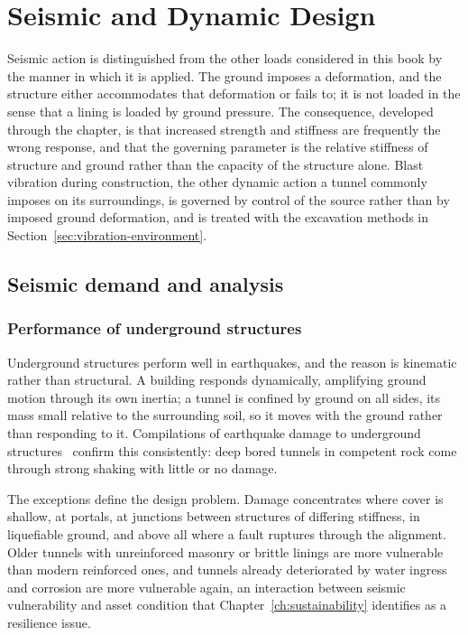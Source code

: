 \chapter{Seismic and Dynamic Design}
\label{ch:seismic}

Seismic action is distinguished from the other loads considered in this book
by the manner in which it is applied. The ground imposes a deformation, and
the structure either accommodates that deformation or fails to; it is not
loaded in the sense that a lining is loaded by ground pressure. The
consequence, developed through the chapter, is that increased strength and
stiffness are frequently the wrong response, and that the governing parameter
is the relative stiffness of structure and ground rather than the capacity of
the structure alone. Blast vibration during construction, the other dynamic
action a tunnel commonly imposes on its surroundings, is governed by control
of the source rather than by imposed ground deformation, and is treated with
the excavation methods in Section~\ref{sec:vibration-environment}.

\section{Seismic demand and analysis}
\label{sec:seismic-demand}

\subsection{Performance of underground structures}
\label{sec:seismic-performance}

Underground structures perform well in earthquakes, and the reason is
kinematic rather than structural. A building responds dynamically, amplifying
ground motion through its own inertia; a tunnel is confined by ground on all
sides, its mass small relative to the surrounding soil, so it moves with the
ground rather than responding to it. Compilations of earthquake damage to
underground structures~\citep{hashash2001seismic} confirm this consistently:
deep bored tunnels in competent rock come through strong shaking
with little or no damage.

The exceptions define the design problem. Damage concentrates where cover is
shallow, at portals, at junctions between structures of differing stiffness, in
liquefiable ground, and above all where a fault ruptures through the
alignment. Older tunnels with unreinforced masonry or brittle linings are more
vulnerable than modern reinforced ones, and tunnels already deteriorated by
water ingress and corrosion are more vulnerable again, an interaction
between seismic vulnerability and asset condition that
Chapter~\ref{ch:sustainability} identifies as a resilience issue.

